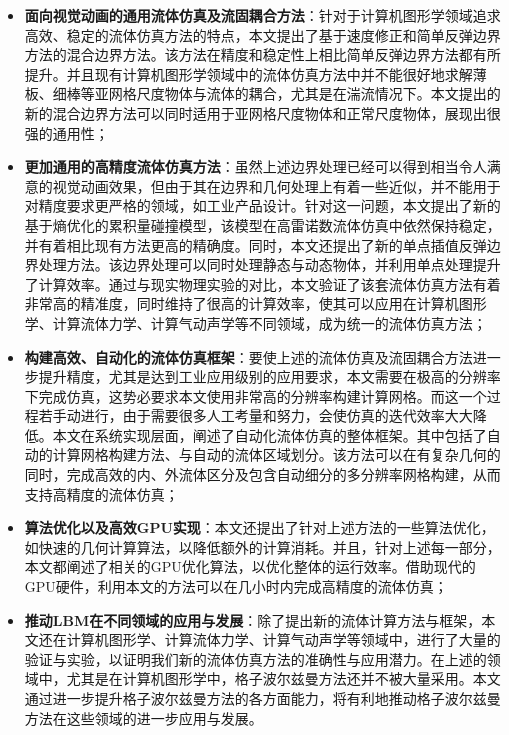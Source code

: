 \begin{itemize}
    \item \textbf{面向视觉动画的通用流体仿真及流固耦合方法}：针对于计算机图形学领域追求高效、稳定的流体仿真方法的特点，本文提出了基于速度修正和简单反弹边界方法的混合边界方法。该方法在精度和稳定性上相比简单反弹边界方法都有所提升。并且现有计算机图形学领域中的流体仿真方法中并不能很好地求解薄板、细棒等亚网格尺度物体与流体的耦合，尤其是在湍流情况下。本文提出的新的混合边界方法可以同时适用于亚网格尺度物体和正常尺度物体，展现出很强的通用性；
    \item \textbf{更加通用的高精度流体仿真方法}：虽然上述边界处理已经可以得到相当令人满意的视觉动画效果，但由于其在边界和几何处理上有着一些近似，并不能用于对精度要求更严格的领域，如工业产品设计。针对这一问题，本文提出了新的基于熵优化的累积量碰撞模型，该模型在高雷诺数流体仿真中依然保持稳定，并有着相比现有方法更高的精确度。同时，本文还提出了新的单点插值反弹边界处理方法。该边界处理可以同时处理静态与动态物体，并利用单点处理提升了计算效率。通过与现实物理实验的对比，本文验证了该套流体仿真方法有着非常高的精准度，同时维持了很高的计算效率，使其可以应用在计算机图形学、计算流体力学、计算气动声学等不同领域，成为统一的流体仿真方法；
    \item \textbf{构建高效、自动化的流体仿真框架}：要使上述的流体仿真及流固耦合方法进一步提升精度，尤其是达到工业应用级别的应用要求，本文需要在极高的分辨率下完成仿真，这势必要求本文使用非常高的分辨率构建计算网格。而这一个过程若手动进行，由于需要很多人工考量和努力，会使仿真的迭代效率大大降低。本文在系统实现层面，阐述了自动化流体仿真的整体框架。其中包括了自动的计算网格构建方法、与自动的流体区域划分。该方法可以在有复杂几何的同时，完成高效的内、外流体区分及包含自动细分的多分辨率网格构建，从而支持高精度的流体仿真；
    \item \textbf{算法优化以及高效GPU实现}：本文还提出了针对上述方法的一些算法优化，如快速的几何计算算法，以降低额外的计算消耗。并且，针对上述每一部分，本文都阐述了相关的GPU优化算法，以优化整体的运行效率。借助现代的GPU硬件，利用本文的方法可以在几小时内完成高精度的流体仿真；
    \item \textbf{推动LBM在不同领域的应用与发展}：除了提出新的流体计算方法与框架，本文还在计算机图形学、计算流体力学、计算气动声学等领域中，进行了大量的验证与实验，以证明我们新的流体仿真方法的准确性与应用潜力。在上述的领域中，尤其是在计算机图形学中，格子波尔兹曼方法还并不被大量采用。本文通过进一步提升格子波尔兹曼方法的各方面能力，将有利地推动格子波尔兹曼方法在这些领域的进一步应用与发展。
\end{itemize}

